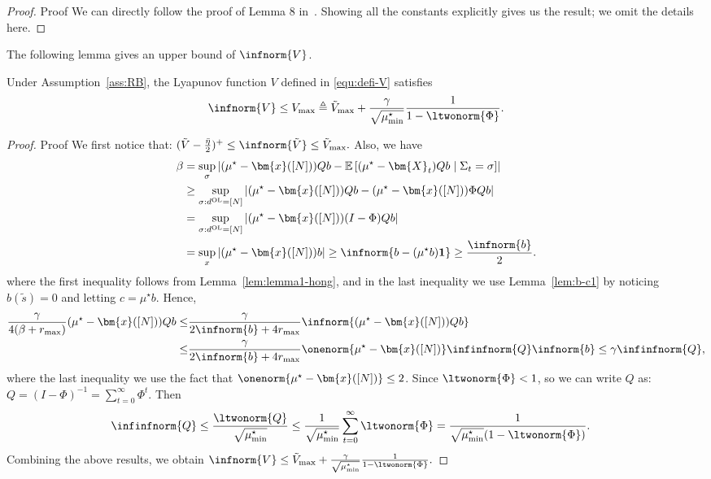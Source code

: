 \documentclass[mnsc,nonblindrev]{informs3}
\newcommand{\E}{\mathbb{E}}
\newcommand{\one}{\mathbf{1}}
\newcommand{\bmx}{\bm{x}}
\begin{document}
\begin{APPENDICES}
\begin{proof}{Proof}
We can directly follow the proof of Lemma 8 in~\citet{hong2024achieving}. Showing all the constants explicitly gives us the result; we omit the details here.
\end{proof}

The following lemma gives an upper bound of $\infnorm{V}$.
\begin{lemma}\label{lem:upperbound-V}
    Under Assumption~\ref{ass:RB}, the Lyapunov function $V$ defined in \eqref{equ:defi-V} satisfies 
     \[
        \infnorm{V}\le V_{\max}\triangleq\tilde V_{\max}+\frac{\gamma}{\sqrt{\mu^\star_{\min}}}\frac{1}{1-\ltwonorm{\Phi}}.
    \]
\end{lemma}
\begin{proof}{Proof}
    We first notice that:
    $
        (\tilde V-\frac{\bar\eta}{2})^+\le \infnorm{\tilde V}\le \tilde V_{\max}.
    $
    Also, we have
    \begin{align*}
        \beta&=\sup_\sigma\left|(\mu^\star-\bmx([N]))Qb-\E\left[(\mu^\star-\bm{X}_t)Qb\mid \Sigma_t=\sigma\right]\right| \\
        & \ge \sup_{\sigma:d^{\mathrm{OL}}=[N]}\left|(\mu^\star-\bmx([N]))Qb-(\mu^\star-\bmx([N]))\Phi Qb\right| \\
        & = \sup_{\sigma:d^{\mathrm{OL}}=[N]}\left|(\mu^\star-\bmx([N]))(I-\Phi) Qb\right| \\
        & = \sup_x\left|(\mu^\star-\bmx([N]))b\right| 
          \ge \infnorm{b-(\mu^\star b)\one} \ge \frac{\infnorm{b}}{2}.
    \end{align*}
    where the first inequality follows from Lemma~\ref{lem:lemma1-hong}, and in the last inequality we use Lemma~\ref{lem:b-c1} by noticing $b(\tilde{s})=0$ and letting $c=\mu^\star b$. 
    Hence,
    \begin{align*}
        \frac{\gamma}{4(\beta+r_{\max})}(\mu^\star-\bmx([N]))Qb
        \le &\frac{\gamma}{2\infnorm{b}+4r_{\max}}\infnorm{(\mu^\star-\bmx([N]))Qb}\\
        \le&\frac{\gamma}{2\infnorm{b}+4r_{\max}}\onenorm{\mu^\star-\bmx([N])}\infinfnorm{Q}\infnorm{b}\le\gamma\infinfnorm{Q},
    \end{align*}
    where the last inequality we use the fact that $\onenorm{\mu^\star-\bmx([N])}\le 2$. Since $\ltwonorm{\Phi}<1$, so we can write $Q$ as:
    $
        Q=(I-\Phi)^{-1}=\sum_{t=0}^\infty\Phi^t.
    $
    Then 
    \begin{align*}
        \infinfnorm{Q}
        \le \frac{\ltwonorm{Q}}{\sqrt{\mu^\star_{\min}}}
        &\le \frac{1}{\sqrt{\mu^\star_{\min}}}\sum_{t=0}^\infty \ltwonorm{\Phi} 
        = \frac{1}{\sqrt{\mu^\star_{\min}}(1-\ltwonorm{\Phi})}.
    \end{align*}
    Combining the above results, we obtain
    $
        \infnorm{V}\le \tilde V_{\max}+\frac{\gamma}{\sqrt{\mu^\star_{\min}}}\frac{1}{1-\ltwonorm{\Phi}}.
    $
\end{proof}



\end{APPENDICES}
\end{document}
